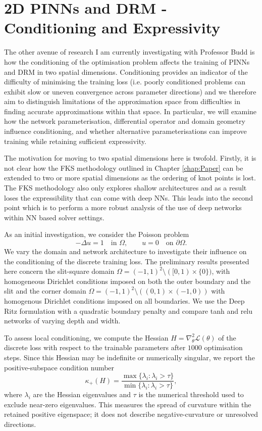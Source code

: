 \documentclass[11pt, onecolumn]{report}
\begin{document}
\section{2D PINNs and DRM - Conditioning and Expressivity}
\label{sec:Conditioning}
The other avenue of research I am currently investigating with Professor Budd is how the conditioning of the optimisation problem affects the training of PINNs and DRM in two spatial dimensions. Conditioning provides an indicator of the difficulty of minimising the training loss (i.e. poorly conditioned problems can exhibit slow or uneven convergence across parameter directions) and we therefore aim to distinguish limitations of the approximation space from difficulties in finding accurate approximations within that space. In particular, we will examine how the network parameterisation, differential operator and domain geometry influence conditioning, and whether alternative parameterisations can improve training while retaining sufficient expressivity. 

The motivation for moving to two spatial dimensions here is twofold. Firstly, it is not clear how the FKS methodology outlined in Chapter \ref{chap:Paper} can be extended to two or more spatial dimensions as the ordering of knot points is lost. The FKS methodology also only explores shallow architectures and as a result loses the expressibility that can come with deep NNs. This leads into the second point which is to perform a more robust analysis of the use of deep networks within NN based solver settings.

As an initial investigation, we consider the Poisson problem
\begin{equation}
    -\Delta u = 1 \quad \text{in } \Omega,
    \qquad u = 0 \quad \text{on } \partial\Omega.
\end{equation}
We vary the domain and network architecture to investigate their influence on the conditioning of the discrete training loss. The preliminary results presented here concern the slit-square domain $\Omega=(-1,1)^2\setminus([0,1)\times\{0\})$, with homogeneous Dirichlet conditions imposed on both the outer boundary and the slit and the corner domain $\Omega = (-1,1)^2\setminus((0,1)\times(-1,0))$ with homogenous Dirichlet conditions imposed on all boundaries. We use the Deep Ritz formulation with a quadratic boundary penalty and compare tanh and relu networks of varying depth and width.

To assess local conditioning, we compute the Hessian $H=\nabla_\theta^2\mathcal{L}(\theta)$ of the discrete loss with respect to the trainable parameters after $1000$ optimisation steps. Since this Hessian may be indefinite or numerically singular, we report the positive-subspace condition number
\begin{equation}
    \kappa_+(H)
    =
    \frac{\max\{\lambda_i:\lambda_i>\tau\}}
         {\min\{\lambda_i:\lambda_i>\tau\}},
\end{equation}
where $\lambda_i$ are the Hessian eigenvalues and $\tau$ is the numerical threshold used to exclude near-zero eigenvalues. This measures the spread of curvature within the retained positive eigenspace; it does not describe negative-curvature or unresolved directions.
\end{document}
